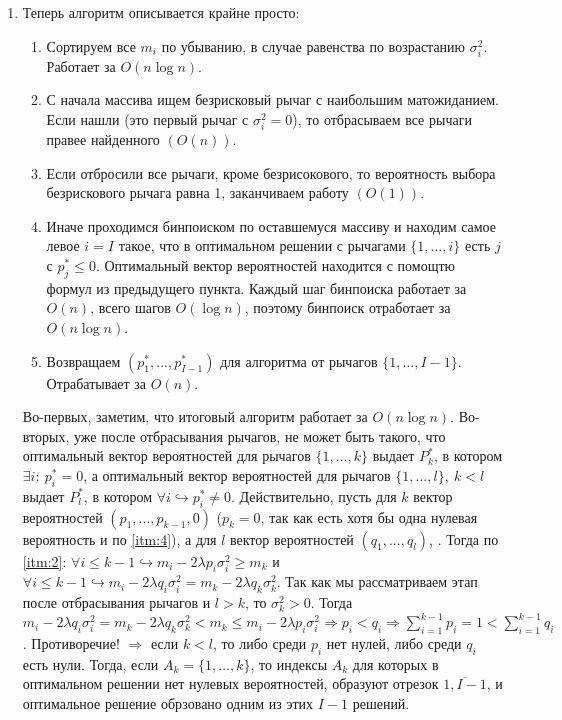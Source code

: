 \begin{enumerate}
    \item Теперь алгоритм описывается крайне просто:
    \begin{enumerate}
        \item Сортируем все $m_i$ по убыванию, в случае равенства по возрастанию $\sigma_i^2$. Работает за $O(n \log n)$.
        \item С начала массива ищем безрисковый рычаг с наибольшим матожиданием. Если нашли (это первый рычаг с $\sigma_i^2 = 0$), то отбрасываем все рычаги правее найденного $\left(O(n) \right)$. 
        \item Если отбросили все рычаги, кроме безрисокового, то вероятность выбора безрискового рычага равна 1, заканчиваем работу $\left( O(1) \right)$.
        \item Иначе проходимся бинпоиском по оставшемуся массиву и находим самое левое $i=I$ такое, что в оптимальном решении с рычагами $\{1, ..., i\}$ есть $j$ с $p_j^* \leq 0$. Оптимальный вектор вероятностей находится с помощтю формул из предыдущего пункта. Каждый шаг бинпоиска работает за $O(n)$, всего шагов $O(\log n)$, поэтому бинпоиск отработает за $O(n \log n)$.
        \item Возвращаем $(p_1^*, ..., p_{I-1}^*)$ для алгоритма от рычагов $\{1, ..., I-1\}$. Отрабатывает за $O(n)$.
    \end{enumerate}
    Во-первых, заметим, что итоговый алгоритм работает за $O(n \log n)$. Во-вторых, уже после отбрасывания рычагов, не может быть такого, что оптимальный вектор вероятностей для рычагов $\{1,...,k\}$ выдает $P_k^*$, в котором $\exists i: \: p_i^* = 0$, а оптимальный вектор вероятностей для рычагов $\{1, ..., l\}, \: k < l$ выдает $P_l^*$, в котором $\forall i \hookrightarrow p_i^* \neq 0$. Действительно, пусть для $k$ вектор вероятностей $(p_1, ..., p_{k-1}, 0)$ ($p_k = 0$, так как есть хотя бы одна нулевая вероятность и по \ref{itm:4}), а для $l$ вектор вероятностей $(q_1, ..., q_l)$, . Тогда по \ref{itm:2}: $\forall i \leq k - 1 \hookrightarrow m_i - 2 \lambda p_i \sigma_i^2 \geq m_k$ и $\forall i \leq k - 1 \hookrightarrow m_i - 2 \lambda q_i \sigma_i^2 = m_k - 2 \lambda q_k \sigma_k^2$. Так как мы рассматриваем этап после отбрасывания рычагов и $l > k$, то $\sigma_k^2 > 0$. Тогда $m_i - 2 \lambda q_i \sigma_i^2 = m_k - 2 \lambda q_k \sigma_k^2 < m_k \leq m_i - 2 \lambda p_i \sigma_i^2 \Rightarrow p_i < q_i \Rightarrow \sum_{i=1}^{k-1} p_i = 1 < \sum_{i=1}^{k-1} q_i$. Противоречие! $\Rightarrow$ если $k < l$, то либо среди $p_i$ нет нулей, либо среди $q_i$ есть нули. Тогда, если $A_k = \{1, ..., k\}$, то индексы $A_k$ для которых в оптимальном решении нет нулевых вероятностей, образуют отрезок $\overline{1, I - 1}$, и оптимальное решение обрзовано одним из этих $I - 1$ решений.


\end{enumerate}
